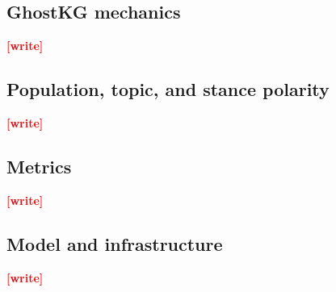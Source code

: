 \documentclass[11pt,a4paper]{article}
\newcommand{\pending}[1]{\textcolor{red}{\textbf{[#1]}}}   %
\begin{document}
\subsection{GhostKG mechanics}\label{sec:method-ghostkg}
\pending{write}

\subsection{Population, topic, and stance polarity}\label{sec:method-pop}
\pending{write}

\subsection{Metrics}\label{sec:method-metrics}
\pending{write}

\subsection{Model and infrastructure}\label{sec:method-model}
\pending{write}

\end{document}
